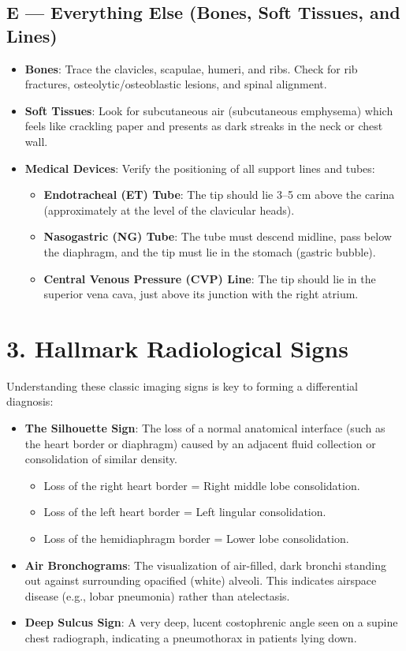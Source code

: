 \subsection*{E --- Everything Else (Bones, Soft Tissues, and Lines)}
\begin{itemize}
    \item \textbf{Bones}: Trace the clavicles, scapulae, humeri, and ribs. Check for rib fractures, osteolytic/osteoblastic lesions, and spinal alignment.
    \item \textbf{Soft Tissues}: Look for subcutaneous air (subcutaneous emphysema) which feels like crackling paper and presents as dark streaks in the neck or chest wall.
    \item \textbf{Medical Devices}: Verify the positioning of all support lines and tubes:
    \begin{itemize}
        \item \textbf{Endotracheal (ET) Tube}: The tip should lie 3--5 cm above the carina (approximately at the level of the clavicular heads).
        \item \textbf{Nasogastric (NG) Tube}: The tube must descend midline, pass below the diaphragm, and the tip must lie in the stomach (gastric bubble).
        \item \textbf{Central Venous Pressure (CVP) Line}: The tip should lie in the superior vena cava, just above its junction with the right atrium.
    \end{itemize}
\end{itemize}


\section*{3. Hallmark Radiological Signs}
Understanding these classic imaging signs is key to forming a differential diagnosis:

\begin{itemize}
    \item \textbf{The Silhouette Sign}: The loss of a normal anatomical interface (such as the heart border or diaphragm) caused by an adjacent fluid collection or consolidation of similar density.
    \begin{itemize}
        \item Loss of the right heart border = Right middle lobe consolidation.
        \item Loss of the left heart border = Left lingular consolidation.
        \item Loss of the hemidiaphragm border = Lower lobe consolidation.
    \end{itemize}
    \item \textbf{Air Bronchograms}: The visualization of air-filled, dark bronchi standing out against surrounding opacified (white) alveoli. This indicates airspace disease (e.g., lobar pneumonia) rather than atelectasis.
    \item \textbf{Deep Sulcus Sign}: A very deep, lucent costophrenic angle seen on a supine chest radiograph, indicating a pneumothorax in patients lying down.
\end{itemize}


